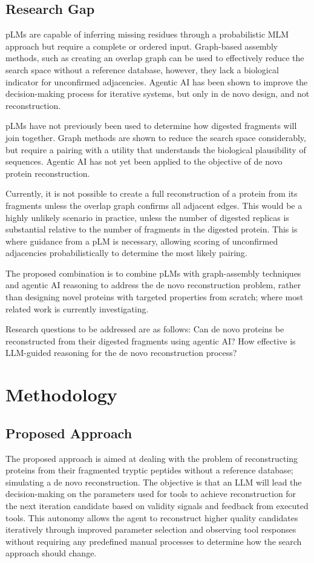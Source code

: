 \documentclass[journal]{IEEEtran}
\begin{document}
\subsection{Research Gap}
pLMs are capable of inferring missing residues through a probabilistic MLM approach but require a complete or ordered input.
Graph-based assembly methods, such as creating an overlap graph can be used to effectively reduce the search
space without a reference database, however, they lack a biological indicator for unconfirmed adjacencies.
Agentic AI has been shown to improve the decision-making process for iterative systems, but only in de novo design,
and not reconstruction.

pLMs have not previously been used to determine how digested fragments will join together. Graph methods are shown to reduce
the search space considerably, but require a pairing with a utility that understands the biological plausibility of sequences.
Agentic AI has not yet been applied to the objective of de novo protein reconstruction.

Currently, it is not possible to create a full reconstruction of a protein from its fragments unless the overlap graph confirms all
adjacent edges. This would be a highly unlikely scenario in practice, unless the number of digested replicas is substantial
relative to the number of fragments in the digested protein. This is where guidance from a pLM is necessary,
allowing scoring of unconfirmed adjacencies probabilistically to determine the most likely pairing.

The proposed combination is to combine pLMs with graph-assembly techniques and agentic AI reasoning to address
the de novo reconstruction problem, rather than designing novel proteins with targeted properties from
scratch; where most related work is currently investigating.

Research questions to be addressed are as follows: Can de novo proteins be reconstructed from their digested fragments
using agentic AI? How effective is LLM-guided reasoning for the de novo reconstruction process?

\section{Methodology}
\subsection{Proposed Approach}
The proposed approach is aimed at dealing with the problem of reconstructing proteins from their
fragmented tryptic peptides without a reference database; simulating a de novo reconstruction. The objective is that an LLM will lead the decision-making
on the parameters used for tools to achieve reconstruction for the next iteration candidate based on validity signals and feedback from executed tools.
This autonomy allows the agent to reconstruct higher quality candidates iteratively through improved
parameter selection and observing tool responses without requiring any predefined manual processes to determine how
the search approach should change.
\end{document}
